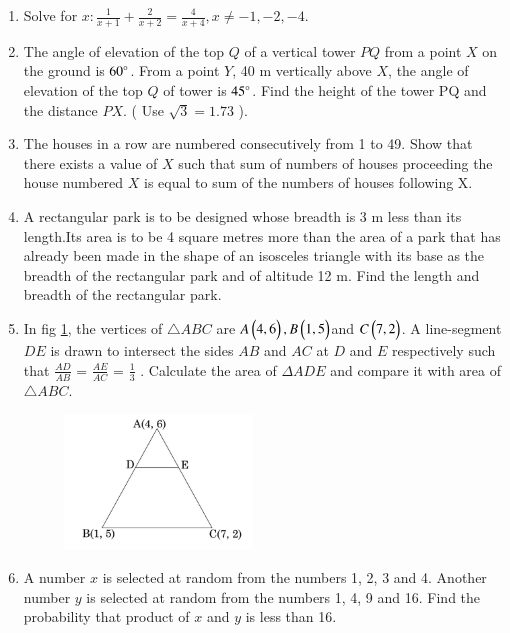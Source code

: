 \documentclass[book,11pt,onecolumn]{IEEEtran}
\renewcommand\thesection{\arabic{section}}
\begin{document}
\begin{enumerate}[label=\thesection.\arabic*.,ref=\thesection.\theenumi]
\item  Solve for $ x :  \frac{1}{x+1}  + \frac{2}{x+2}  = \frac{4}{x+4} , x \neq -1,-2,-4 .$ \\

\item The angle of elevation of the top $Q$ of a vertical tower $PQ$ from a point $X$ on the ground is $ 60\degree $. From a point $Y$, 40 m vertically above $X$, the angle of elevation of the top $Q$ of tower is $ 45 \degree $. Find the height of the tower PQ and the distance $PX$. ( Use $ \sqrt{3} = 1.73 $ ).\\
 
\item The houses in a row are numbered consecutively from 1 to 49. Show that there exists a value of $X$ such that sum of numbers of houses proceeding the house numbered $X$ is equal to sum of the numbers of houses following X.\\

\item A rectangular park is to be designed whose breadth is 3 m less than its length.Its area is to be 4 square metres more than the area of a park that has already been made in the shape of an isosceles triangle with its base as the breadth of the rectangular park and of altitude 12 m. Find the length and breadth of the rectangular park.\\

\item In fig \ref{figure_8}, the vertices of $\triangle ABC$ are $A\begin{pmatrix}4, 6\end{pmatrix}, B\begin{pmatrix}1, 5\end{pmatrix}$and $C\begin{pmatrix}7, 2\end{pmatrix}$. A line-segment $DE$ is drawn to intersect the sides $AB$ and $AC$ at $D$ and $E$ respectively such that $\frac{AD}{AB}$ = $\frac{AE}{AC}$ = $\frac{1}{3}$ . Calculate the area of \( \Delta ADE \) and compare it with area of $ \triangle ABC$.\\
	\begin{figure}[H]
      \centering
      \includegraphics[width=5cm]{figs/8.png}
     \caption{}
      \label{figure_8}
\end{figure} 

\item A number $x$ is selected at random from the numbers 1, 2, 3 and 4. Another number $y$ is selected at random from the numbers 1, 4, 9 and 16. Find the probability that product of $x$ and $y$ is less than 16.\\


\end{enumerate}
\end{document}
